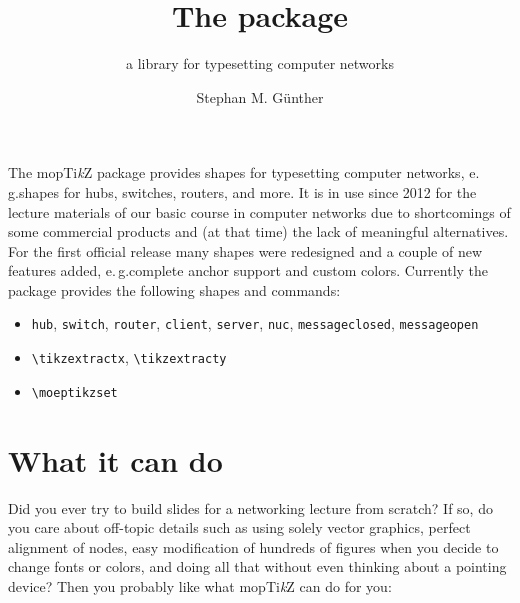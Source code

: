 \documentclass{scrartcl}
\title{The \moeptikz{} package}
\subtitle{a library for typesetting computer networks}
\author{Stephan M. G\"unther}
\newcommand*{\TikZ}{Ti\textit{k}Z\xspace}
\newcommand*{\moeptikz}{mo\reflectbox{e}p\TikZ}
\begin{document}
\maketitle

The \moeptikz{} package provides shapes for typesetting computer networks,
e.\,g.\@ shapes for hubs, switches, routers, and more.
It is in use since 2012 for the lecture materials of our basic course in
computer networks due to shortcomings of some commercial products and
(at that time) the lack of meaningful alternatives.
For the first official release many shapes were redesigned and a couple of new
features added, e.\,g.\@ complete anchor support and custom colors.
Currently the package provides the following shapes and commands:
\begin{itemize}\itemsep0pt
	\item \verb|hub|, \verb|switch|, \verb|router|, \verb|client|,
	\verb|server|, \verb|nuc|, \verb|messageclosed|, \verb|messageopen|
	\item \verb|\tikzextractx|, \verb|\tikzextracty|
	\item \verb|\moeptikzset|{}
\end{itemize}

\section{What it can do}
Did you ever try to build slides for a networking lecture from scratch?
If so, do you care about off-topic details such as using solely vector
graphics, perfect alignment of nodes, easy modification of hundreds of figures
when you decide to change fonts or colors, and doing all that without even
thinking about a pointing device?
Then you probably like what \moeptikz{} can do for you:
\end{document}
